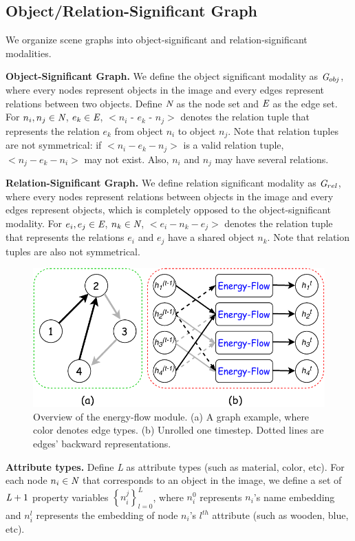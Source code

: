 \documentclass[letterpaper]{article} %
\begin{document}
\subsection{Object/Relation-Significant Graph}
We organize scene graphs into object-significant and relation-significant modalities. 

\medskip
\textbf{Object-Significant Graph.} We define the object significant modality as $\emph{G}_{obj}$, where every nodes represent objects in the image and every edges represent relations between two objects. Define $\emph{N}$ as the node set and $\emph{E}$ as the edge set. For $n_i, n_j \in \emph{N}$, $e_k \in \emph{E}$, $<n_i$ - $e_k$ - $n_j>$ denotes the relation tuple that represents the relation $e_k$ from object $n_i$ to object $n_j$. Note that relation tuples are not symmetrical: if $<n_i - e_k - n_j>$ is a valid relation tuple,  $<n_j - e_k - n_i>$ may not exist. Also, $n_i$ and $n_j$ may have several relations. 

\medskip
\textbf{Relation-Significant Graph.} We define relation significant modality as $\emph{G}_{rel}$, where every nodes represent relations between objects in the image and every edges represent objects, which is completely opposed to the object-significant modality. For $e_i, e_j \in \emph{E}$, $n_k \in \emph{N}$, $<e_i - n_k - e_j>$ denotes the relation tuple that represents the relations $e_i$ and $e_j$ have a shared object $n_k$. Note that relation tuples are also not symmetrical.

\begin{figure}[t] 
    \includegraphics[width=1\textwidth]{./pic/EF.pdf} 
    \caption{Overview of the energy-flow module. (a) A graph example, where color denotes edge types. (b) Unrolled one timestep. Dotted lines are edges' backward representations.} 
    \label{EF} 
\end{figure}

\medskip
\textbf{Attribute types.} Define \emph{L} as attribute types (such as material, color, etc). 
For each node $n_i\in\emph{N}$ that corresponds to an object in the image, we define a set of $\emph{L}+1$ property variables ${\left\{ n_i^j\right\}}_{l=0}^L$, where $n_i^{0}$ represents $n_i$'s name embedding and $n_i^l$ represents the embedding of node $n_i$'s $l^{th}$ attribute (such as wooden, blue, etc).
\end{document}
